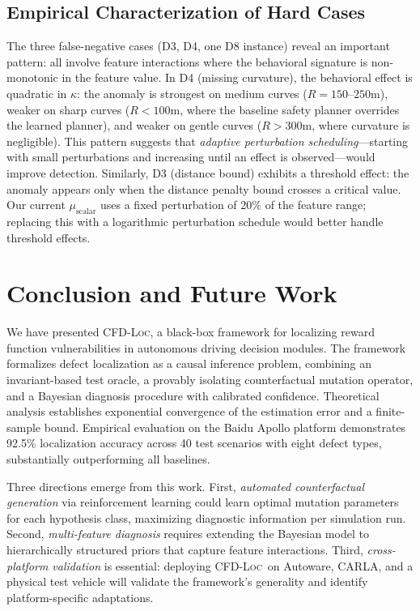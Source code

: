 \documentclass[journal]{IEEEtran}
\theoremstyle{plain}
\newcommand{\methodname}{\textsc{CFD-Loc}}
\begin{document}
\subsection{Empirical Characterization of Hard Cases}

The three false-negative cases (D3, D4, one D8 instance) reveal an important pattern: all involve feature interactions where the behavioral signature is non-monotonic in the feature value. In D4 (missing curvature), the behavioral effect is quadratic in $\kappa$: the anomaly is strongest on medium curves ($R=150$--$250$m), weaker on sharp curves ($R<100$m, where the baseline safety planner overrides the learned planner), and weaker on gentle curves ($R>300$m, where curvature is negligible). This pattern suggests that \emph{adaptive perturbation scheduling}---starting with small perturbations and increasing until an effect is observed---would improve detection. Similarly, D3 (distance bound) exhibits a threshold effect: the anomaly appears only when the distance penalty bound crosses a critical value. Our current $\mu_{\text{scalar}}$ uses a fixed perturbation of 20\% of the feature range; replacing this with a logarithmic perturbation schedule would better handle threshold effects.

\section{Conclusion and Future Work}

We have presented \methodname, a black-box framework for localizing reward function vulnerabilities in autonomous driving decision modules. The framework formalizes defect localization as a causal inference problem, combining an invariant-based test oracle, a provably isolating counterfactual mutation operator, and a Bayesian diagnosis procedure with calibrated confidence. Theoretical analysis establishes exponential convergence of the estimation error and a finite-sample bound. Empirical evaluation on the Baidu Apollo platform demonstrates 92.5\% localization accuracy across 40 test scenarios with eight defect types, substantially outperforming all baselines.

Three directions emerge from this work. First, \emph{automated counterfactual generation} via reinforcement learning could learn optimal mutation parameters for each hypothesis class, maximizing diagnostic information per simulation run. Second, \emph{multi-feature diagnosis} requires extending the Bayesian model to hierarchically structured priors that capture feature interactions. Third, \emph{cross-platform validation} is essential: deploying \methodname\ on Autoware, CARLA, and a physical test vehicle will validate the framework's generality and identify platform-specific adaptations.
\end{document}
